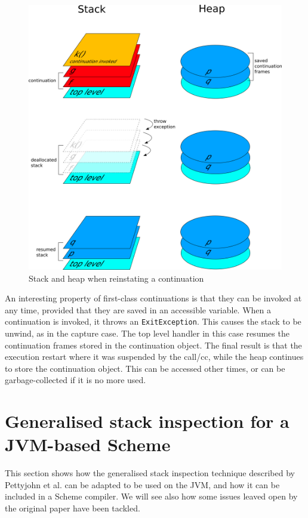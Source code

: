 \documentclass[12pt,a4paper,oneside,openright]{book}
\begin{document}
\begin{figure}[htbp]
\centering
\includegraphics{figures/frames-call.png}
\caption{Stack and heap when reinstating a continuation
\label{frames-call}}
\end{figure}

An interesting property of first-class continuations is that they can be
invoked at any time, provided that they are saved in an accessible
variable. When a continuation is invoked, it throws an
\texttt{ExitException}. This causes the stack to be unwind, as in the
capture case. The top level handler in this case resumes the
continuation frames stored in the continuation object. The final result
is that the execution restart where it was suspended by the call/cc,
while the heap continues to store the continuation object. This can be
accessed other times, or can be garbage-collected if it is no more used.

\section{Generalised stack inspection for a JVM-based
Scheme}\label{generalised-stack-inspection-for-a-jvm-based-scheme}

This section shows how the generalised stack inspection technique
described by Pettyjohn et al. can be adapted to be used on the JVM, and
how it can be included in a Scheme compiler. We will see also how some
issues leaved open by the original paper have been tackled.
\end{document}
